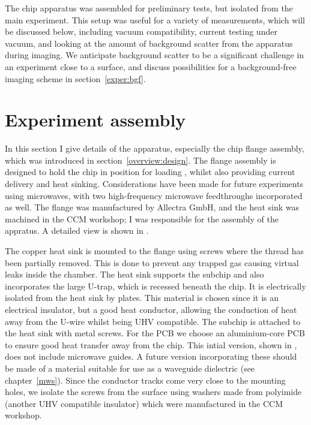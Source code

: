The chip apparatus was assembled for preliminary tests, but isolated from the 
main \CaF{} experiment. This setup was useful for a variety of
measurements, which will be discussed below, including vacuum compatibility,
current testing under vacuum, and looking at the amount of background scatter
from the apparatus during imaging. We anticipate background scatter to be a
significant challenge in an experiment close to a surface, and discuss
possibilities for a background-free imaging scheme in
section~\ref{exper:bgf}.

\section{Experiment assembly}

In this section I give details of the apparatus, especially the chip flange
assembly, which was introduced in section~\ref{overview:design}. The flange
assembly is designed to hold the chip in position for loading \CaF{}, whilst
also providing current delivery and heat sinking. Considerations have been made
for future experiments using microwaves, with two high-frequency microwave
feedthroughs incorporated as well. The flange was manufactured by Allectra
GmbH, and the heat sink was machined in the CCM workshop; I was responsible for
the assembly of the appratus. A detailed view is shown in
.

The copper heat sink is mounted to the flange using screws where the thread has
been partially removed. This is done to prevent any trapped gas causing virtual
leaks inside the chamber. The heat sink supports the subchip and also
incorporates the large U-trap, which is recessed beneath the chip. It is
electrically isolated from the heat sink by \AlN{} plates. This material is
chosen since it is an electrical insulator, but a good heat conductor, allowing
the conduction of heat away from the U-wire whilst being UHV compatible. The
subchip is attached to the heat sink with metal screws. For the PCB we choose
an aluminium-core PCB to ensure good heat transfer away from the chip. This
intial version, shown in , does not include
microwave guides. A future version incorporating these should be made of a
material suitable for use as a waveguide dielectric (see chapter~\ref{mws}).
Since the conductor tracks come very close to the mounting holes, we isolate
the screws from the surface using washers made from polyimide (another UHV
compatible insulator) which were manufactured in the CCM workshop.

